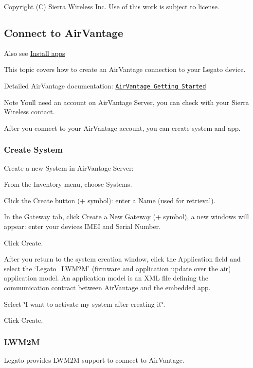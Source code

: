 Copyright (C) Sierra Wireless Inc. Use of this work is subject to license. \hypertarget{howToAVConnect}{}\subsection{Connect to Air\+Vantage}\label{howToAVConnect}
Also see \hyperlink{appInstallAirVantage}{Install apps}





This topic covers how to create an Air\+Vantage connection to your Legato device.

Detailed Air\+Vantage documentation\+: \href{https://doc.airvantage.net/display/USERGUIDE/Getting+Started}{\tt Air\+Vantage Getting Started}

\begin{DoxyNote}{Note}
You\textquotesingle{}ll need an account on Air\+Vantage Server, you can check with your Sierra Wireless contact.
\end{DoxyNote}
After you connect to your Air\+Vantage account, you can create system and app.\hypertarget{how_to_a_v_connect_connectingAirVantage_createSys}{}\subsubsection{Create System}\label{how_to_a_v_connect_connectingAirVantage_createSys}
Create a new System in Air\+Vantage Server\+:
\begin{DoxyItemize}
\item From the {\ttfamily Inventory menu}, choose {\ttfamily Systems}.
\item Click the Create button (+ symbol)\+: enter a Name (used for retrieval).
\item In the {\ttfamily Gateway} tab, click Create a New Gateway (+ symbol), a new windows will appear\+: enter your device\textquotesingle{}s I\+M\+E\+I and Serial Number.
\item Click {\ttfamily Create}.
\item After you return to the system creation window, click the Application field and select the ‘\+Legato\+\_\+\+L\+W\+M2\+M’ (firmware and application update over the air) application model. An application model is an X\+M\+L file defining the communication contract between Air\+Vantage and the embedded app.
\item Select \char`\"{}\+I want to activate my system after creating it\char`\"{}.
\item Click {\ttfamily Create}.
\end{DoxyItemize}\hypertarget{how_to_a_v_connect_connectingAirVantage_lwm2m}{}\subsubsection{L\+W\+M2\+M}\label{how_to_a_v_connect_connectingAirVantage_lwm2m}
Legato provides L\+W\+M2\+M support to connect to Air\+Vantage.

